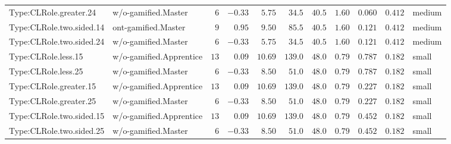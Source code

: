 \documentclass[6pt,a4paper]{article}
\begin{document}
{\begin{longtable}{llrrrrrrrrl}
Type:CLRole.greater.24&w/o-gamified.Master&$ 6$&$-0.33$&$ 5.75$&$ 34.5$&$ 40.5$&$ 1.60$&$0.060$&$0.412$&medium\tabularnewline
Type:CLRole.two.sided.14&ont-gamified.Master&$ 9$&$ 0.95$&$ 9.50$&$ 85.5$&$ 40.5$&$ 1.60$&$0.121$&$0.412$&medium\tabularnewline
Type:CLRole.two.sided.24&w/o-gamified.Master&$ 6$&$-0.33$&$ 5.75$&$ 34.5$&$ 40.5$&$ 1.60$&$0.121$&$0.412$&medium\tabularnewline
Type:CLRole.less.15&w/o-gamified.Apprentice&$13$&$ 0.09$&$10.69$&$139.0$&$ 48.0$&$ 0.79$&$0.787$&$0.182$&small\tabularnewline
Type:CLRole.less.25&w/o-gamified.Master&$ 6$&$-0.33$&$ 8.50$&$ 51.0$&$ 48.0$&$ 0.79$&$0.787$&$0.182$&small\tabularnewline
Type:CLRole.greater.15&w/o-gamified.Apprentice&$13$&$ 0.09$&$10.69$&$139.0$&$ 48.0$&$ 0.79$&$0.227$&$0.182$&small\tabularnewline
Type:CLRole.greater.25&w/o-gamified.Master&$ 6$&$-0.33$&$ 8.50$&$ 51.0$&$ 48.0$&$ 0.79$&$0.227$&$0.182$&small\tabularnewline
\newpage
Type:CLRole.two.sided.15&w/o-gamified.Apprentice&$13$&$ 0.09$&$10.69$&$139.0$&$ 48.0$&$ 0.79$&$0.452$&$0.182$&small\tabularnewline
Type:CLRole.two.sided.25&w/o-gamified.Master&$ 6$&$-0.33$&$ 8.50$&$ 51.0$&$ 48.0$&$ 0.79$&$0.452$&$0.182$&small\tabularnewline
\hline
\end{longtable}}
\end{document}
